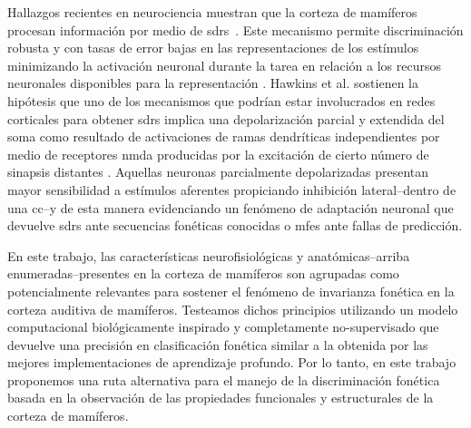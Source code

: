 
Hallazgos recientes en neurociencia muestran que la corteza de mamíferos procesan información por medio de \glspl{sdr}~\cite{barth_2012}. Este mecanismo permite discriminación robusta y con tasas de error bajas en las representaciones de los estímulos minimizando la activación neuronal durante la tarea en relación a los recursos neuronales disponibles para la representación \cite{ahmad_2016}. Hawkins et al. \cite{hawkins_2016} sostienen la hipótesis que uno de los mecanismos que podrían estar involucrados en redes corticales para obtener \glspl{sdr} implica una depolarización parcial y extendida del soma como resultado de activaciones de ramas dendríticas independientes por medio de receptores \gls{nmda} producidas por la excitación de cierto número de sinapsis distantes \cite{antic_2010, major_2013}. Aquellas neuronas parcialmente depolarizadas presentan mayor sensibilidad a estímulos aferentes propiciando inhibición lateral--dentro de una \gls{cc}--y de esta manera evidenciando un fenómeno de adaptación neuronal que devuelve \glspl{sdr} ante secuencias fonéticas conocidas o \glspl{mfe} ante fallas de predicción.


En este trabajo, las características neurofisiológicas y anatómicas--arriba enumeradas--presentes en la corteza de mamíferos son agrupadas como potencialmente relevantes para sostener el fenómeno de invarianza fonética en la corteza auditiva de mamíferos. Testeamos dichos principios utilizando un modelo computacional biológicamente inspirado y completamente no-supervisado que devuelve una precisión en clasificación fonética similar a la obtenida por las mejores implementaciones de aprendizaje profundo. Por lo tanto, en este trabajo proponemos una ruta alternativa para el manejo de la discriminación fonética basada en la observación de las propiedades funcionales y estructurales de la corteza de mamíferos. 

